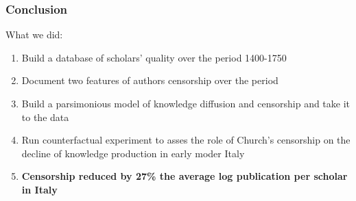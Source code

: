 \documentclass[aspectratio=169,red,12pt]{beamer}
\begin{document}
\begin{frame}
	\frametitle{Conclusion}
What we did:  \vspace{0.3cm}
	\begin{enumerate}
	\item Build a database of scholars' quality over the period 1400-1750 \vspace{0.3cm}
	\item Document two features of authors censorship over the period \vspace{0.3cm}
	\item Build a parsimonious model of knowledge diffusion and censorship and take it to the data
	\vspace{0.3cm}
	\item Run counterfactual experiment to asses the role of Church's censorship on the decline of knowledge production in early moder Italy
	\vspace{0.3cm}
	\item \textbf{Censorship reduced by 27\% the average log publication per scholar in Italy} 
\end{enumerate}
\vspace{0.6cm}
\end{frame}
\end{document}
